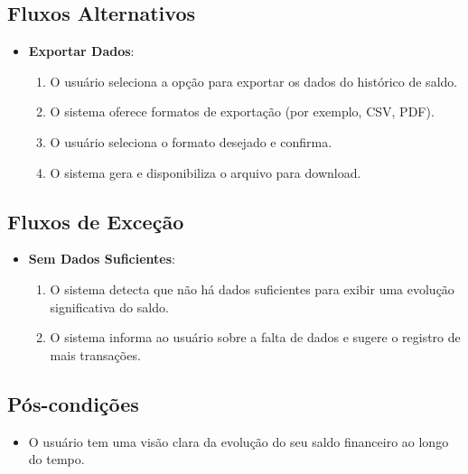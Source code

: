 \subsection*{Fluxos Alternativos}
\begin{addmargin}[1.5cm]{0cm}
	\begin{itemize}
		\item \textbf{Exportar Dados}:
		      \begin{enumerate}
			      \item O usuário seleciona a opção para exportar os dados do histórico de saldo.
			      \item O sistema oferece formatos de exportação (por exemplo, CSV, PDF).
			      \item O usuário seleciona o formato desejado e confirma.
			      \item O sistema gera e disponibiliza o arquivo para download.
		      \end{enumerate}
	\end{itemize}
\end{addmargin}

\subsection*{Fluxos de Exceção}
\begin{addmargin}[1.5cm]{0cm}
	\begin{itemize}
		\item \textbf{Sem Dados Suficientes}:
		      \begin{enumerate}
			      \item O sistema detecta que não há dados suficientes para exibir uma evolução significativa do saldo.
			      \item O sistema informa ao usuário sobre a falta de dados e sugere o registro de mais transações.
		      \end{enumerate}
	\end{itemize}
\end{addmargin}

\subsection*{Pós-condições}
\begin{addmargin}[1.5cm]{0cm}
	\begin{itemize}
		\item O usuário tem uma visão clara da evolução do seu saldo financeiro ao longo do tempo.
	\end{itemize}
\end{addmargin}

